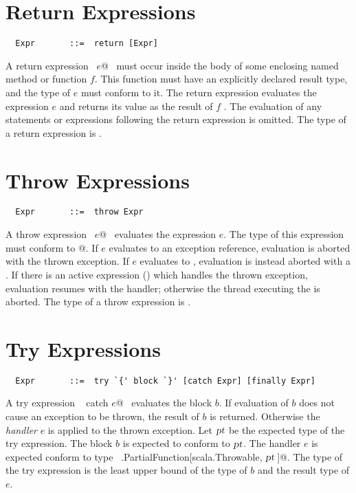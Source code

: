 \documentclass[a4paper,12pt,twoside,titlepage]{book}
\newcommand{\proto}{\mbox{\sl pt}}
\begin{document}
\section{Return Expressions}

\syntax\begin{lstlisting}
  Expr       ::=  return [Expr]
\end{lstlisting}

A return expression ~\lstinline@return $e$@~ must occur inside the
body of some enclosing named method or function $f$. This function
must have an explicitly declared result type, and the type of $e$ must
conform to it. The return expression evaluates the expression $e$ and
returns its value as the result of $f$ . The evaluation of any statements or
expressions following the return expression is omitted. The type of 
a return expression is .



\section{Throw Expressions}

\syntax\begin{lstlisting}
  Expr       ::=  throw Expr
\end{lstlisting}

A throw expression ~\lstinline@throw $e$@~ evaluates the expression
$e$. The type of this expression must conform to
@.  If $e$ evaluates to an exception
reference, evaluation is aborted with the thrown exception. If $e$
evaluates to , evaluation is instead aborted with a
. If there is an active
 expression () which handles the thrown
exception, evaluation resumes with the handler; otherwise the thread
executing the  is aborted.  The type of a throw expression
is .

\section{Try Expressions}\label{sec:try}

\syntax\begin{lstlisting}
  Expr       ::=  try `{' block `}' [catch Expr] [finally Expr]
\end{lstlisting}

A try expression ~ catch $e$@~ evaluates the block
$b$.  If evaluation of $b$ does not cause an exception to be
thrown, the result of $b$ is returned. Otherwise the {\em
handler} $e$ is applied to the thrown exception.  Let $\proto$
be the expected type of the try expression.  The block $b$ is
expected to conform to $\proto$.  The handler $e$ is expected
conform to type ~\lstinline@scala.PartialFunction[scala.Throwable, $\proto\,$]@.
The type of the try expression is the least upper bound of the type of
$b$ and the result type of $e$.
\end{document}

